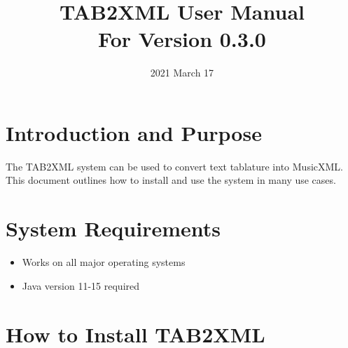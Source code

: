 \documentclass[11pt]{article}
\date{2021 March 17}
\title{TAB2XML User Manual\\\medskip
\large For Version 0.3.0}
\begin{document}
\maketitle
\tableofcontents

\newpage

\section{Introduction and Purpose}
\label{sec:org26f0d1c}
The TAB2XML system can be used to convert text tablature into MusicXML.  This document outlines how to install and use the system in many use cases.
\section{System Requirements}
\label{sec:org2f9e005}
\begin{itemize}
\item Works on all major operating systems
\item Java version 11-15 required
\end{itemize}
\section{How to Install TAB2XML}
\label{sec:orgd6e915d}
\end{document}
